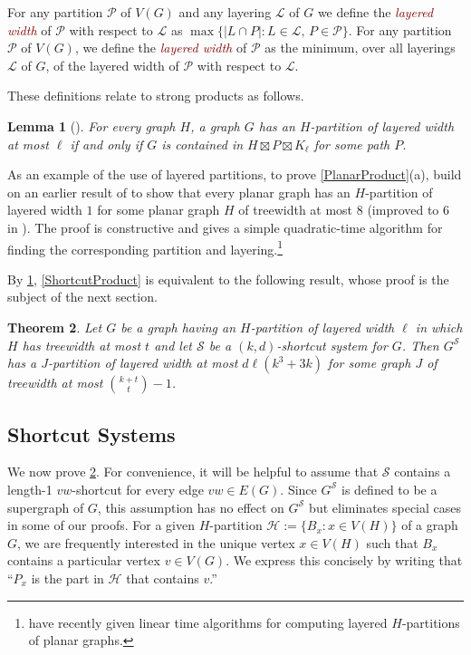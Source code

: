 \documentclass{patmorin}
\theoremstyle{plain}
\newtheorem{thm}{Theorem}
\newtheorem{lem}[thm]{Lemma}
\theoremstyle{definition}
\newcommand{\defin}[1]{\textcolor{Maroon}{\emph{#1}}}
\newcommand{\PP}{\mathcal{P}}
\renewcommand{\SS}{\mathcal{S}}
\begin{document}
For any partition $\PP$ of $V(G)$ and any layering $\mathcal{L}$ of $G$ we define the \defin{layered width} of $\PP$ with respect to $\mathcal{L}$ as $\max\{|L\cap P|: L\in\mathcal{L},\, P\in\PP\}$.  For any partition $\PP$ of $V(G)$, we define the \defin{layered width} of $\PP$ as the minimum, over all layerings $\mathcal{L}$ of $G$, of the layered width of $\PP$ with respect to $\mathcal{L}$.

These definitions relate to strong products as follows.

\begin{lem}[\citep{DJMMUW20}]
\label{PartitionProduct}
For every graph $H$, a graph $G$ has an $H$-partition of layered width at most $\ell$ if and only if $G$ is contained in $H \boxtimes P \boxtimes K_\ell$ for some path $P$.
\end{lem}

As an example of the use of layered partitions, to prove \cref{PlanarProduct}(a),
\citet{DJMMUW20} build on an earlier result of \citet{PS21} to show that every planar graph has an $H$-partition of layered width $1$ for some planar graph $H$ of treewidth at most $8$ (improved to $6$ in \citep{UWY22}). The proof is constructive and gives a simple quadratic-time algorithm for finding the corresponding partition and layering.\footnote{\citet{bose.morin.ea:optimal} have recently given linear time algorithms for computing layered $H$-partitions of planar graphs.}

By \cref{PartitionProduct}, \cref{ShortcutProduct} is equivalent to the following result, whose proof is the subject of the next section.

\begin{thm}
  \label{ShortcutPartition}
  Let $G$ be a graph having an $H$-partition of layered width $\ell$ in which $H$ has treewidth at most $t$ and let $\SS$ be a $(k,d)$-shortcut system for $G$.  Then $G^\SS$ has a $J$-partition of layered width at most $d\ell(k^3+3k)$ for some graph $J$ of treewidth at most $\binom{k+t}{t}-1$.
\end{thm}


\subsection{Shortcut Systems}

We now prove \cref{ShortcutPartition}.
For convenience, it will be helpful to assume that $\SS$ contains a length-1 $vw$-shortcut for every edge $vw\in E(G)$.  Since $G^\SS$ is defined to be a supergraph of $G$, this assumption has no effect on $G^{\SS}$ but eliminates special cases in some of our proofs.  For a given $H$-partition $\mathcal{H}:=\{B_x:x\in V(H)\}$ of a graph $G$, we are frequently interested in the unique vertex $x\in V(H)$ such that $B_x$ contains a particular vertex $v\in V(G)$.  We express this concisely by writing that ``$P_x$ is the part in $\mathcal{H}$ that contains $v$.''
\end{document}
